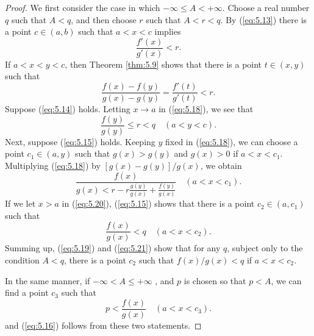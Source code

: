 \begin{proof}
    We first consider the case in which $- \infty \leq A < + \infty$.
    Choose a real number $q$ such that $A < q$, 
    and then choose $r$ such that $A < r < q$.
    By (\ref{eq:5.13}) there is a point $c \in (a, b)$ 
    such that $a < x < c$ implies
    \begin{equation}
        \label{eq:5.17}
        \frac{f'(x)}{g'(x)} < r.
    \end{equation}
    If $a< x < y < c$, 
    then Theorem \ref{thm:5.9} shows that 
    there is a point $t \in (x, y)$
    such that
    \begin{equation}
        \label{eq:5.18}
        \frac{f(x)-f(y)}{g(x)-g(y)} = 
        \frac{f'(t)}{g'(t)} < r.
    \end{equation}
    Suppose (\ref{eq:5.14}) holds. 
    Letting $x \rightarrow a$ in (\ref{eq:5.18}), 
    we see that
    \begin{equation}
        \label{eq:5.19}
        \frac{f(y)}{g(y)} \leq r < q
        \quad
        (a< y < c).
    \end{equation}
    Next, suppose (\ref{eq:5.15}) holds.
    Keeping $y$ fixed in (\ref{eq:5.18}), 
    we can choose a point $c_1 \in (a, y)$ 
    such that $g(x) > g(y)$ and $g(x) > 0$ if $a< x < c_1$. 
    Multiplying (\ref{eq:5.18}) by $[g(x) - g(y)]/g(x)$, 
    we obtain
    \begin{equation}
        \label{eq:5.20}
        \frac{f(x)}{g(x) < r - r\frac{g(y)}{g(x)} + \frac{f(y)}{g(x)}}
        \quad
        (a < x < c_1).
    \end{equation}
    If we let $x > a$ in (\ref{eq:5.20}), 
    (\ref{eq:5.15}) shows that there is a point $c_2 \in (a, c_1)$
    such that
    \begin{equation}
        \label{eq:5.21}
        \frac{f(x)}{g(x)} < q
        \quad 
        (a < x < c_2).
    \end{equation}
    Summing up, (\ref{eq:5.19}) and (\ref{eq:5.21}) show that 
    for any $q$, subject only to the condition $A < q$, 
    there is a point $c_2$ 
    such that $f(x)/g(x) < q$ if $a< x < c_2$.
    
    In the same manner, if $- \infty  < A \leq + \infty$ , 
    and $p$ is chosen so that $p < A$, we can find a point $c_3$ 
    such that
    \begin{equation}
        \label{eq:5.22}
        p < \frac{f(x)}{g(x)}
        \quad 
        (a < x < c_3).
    \end{equation}
    and (\ref{eq:5.16}) follows from these two statements.
\end{proof}
